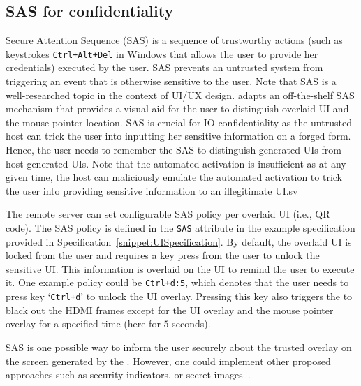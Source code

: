\subsection{SAS for confidentiality} 
\label{sec:confidentiality:SAS}

Secure Attention Sequence (SAS) is a sequence of trustworthy actions (such as keystrokes \texttt{Ctrl+Alt+Del} in Windows that allows the user to provide her credentials) executed by the user. SAS prevents an untrusted system from triggering an event that is otherwise sensitive to the user. Note that SAS is a well-researched topic in the context of UI/UX design. \name adapts an off-the-shelf SAS mechanism that provides a visual aid for the user to distinguish overlaid UI and the mouse pointer location. SAS is crucial for IO confidentiality as the untrusted host can trick the user into inputting her sensitive information on a forged form. Hence, the user needs to remember the SAS to distinguish \device generated UIs from host generated UIs. Note that the automated activation is insufficient as at any given time, the host can maliciously emulate the automated activation to trick the user into providing sensitive information to an illegitimate UI.sv

 The remote server can set configurable SAS policy per overlaid UI (i.e., QR code). The SAS policy is defined in the \texttt{SAS} attribute in the example specification provided in Specification~\ref{snippet:UISpecification}. By default, the overlaid UI is locked from the user and requires a key press from the user to unlock the sensitive UI. This information is overlaid on the UI to remind the user to execute it. One example policy could be \texttt{Ctrl+d:5}, which denotes that the user needs to press key `\texttt{Ctrl+d}' to unlock the UI overlay. Pressing this key also triggers the \device to black out the HDMI frames except for the UI overlay and the mouse pointer overlay for a specified time (here for $5$ seconds). 

SAS is one possible way to inform the user securely about the trusted overlay on the screen generated by the \device. However, one could implement other proposed approaches such as security indicators, or secret images~\cite{6894474,Marforio2016}.
